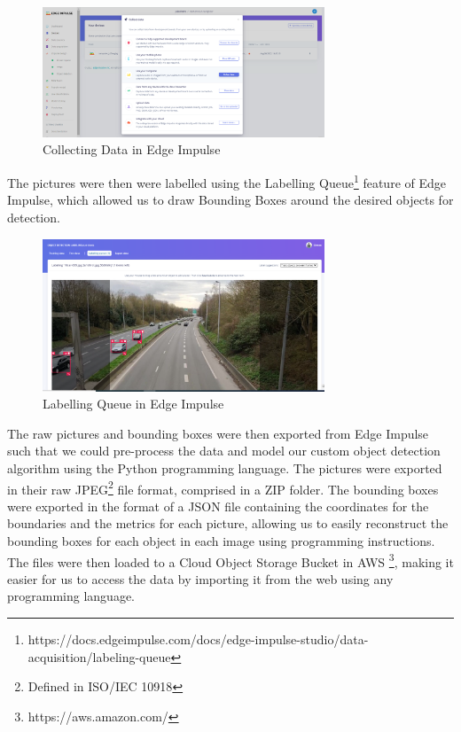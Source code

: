 \documentclass[openright]{normas-utf-tex} %
\begin{document}
\begin{figure}[H]
	\centering
	\includegraphics[width=0.75\textwidth]{./images/edge-impulse-collect-data.png}
	\caption[Collecting Data in Edge Impulse]{Collecting Data in Edge Impulse}
    \label{fig:diff}
\end{figure}

The pictures were then were labelled using the Labelling Queue\footnote{https://docs.edgeimpulse.com/docs/edge-impulse-studio/data-acquisition/labeling-queue}
feature of Edge Impulse, which allowed us to draw Bounding Boxes around the desired objects for detection.

\begin{figure}[H]
	\centering
	\includegraphics[width=0.75\textwidth]{./images/edge-impulse-labelling-queue.png}
	\caption[Labelling Queue in Edge Impulse]{Labelling Queue in Edge Impulse}
    \label{fig:diff}
\end{figure}

The raw pictures and bounding boxes were then exported from Edge Impulse such
that we could pre-process the data and model our custom object detection
algorithm using the Python programming language. The pictures were exported in
their raw JPEG\footnote{Defined in ISO/IEC 10918}  file format, comprised in a
ZIP folder. The bounding boxes were exported in the format of a JSON file
containing the coordinates for the boundaries and the metrics for each picture,
allowing us to easily reconstruct the bounding boxes for each object in each
image using programming instructions. The files were then loaded to a Cloud
Object Storage Bucket in AWS \footnote{https://aws.amazon.com/}, making it
easier for us to access the data by importing it from the web using any
programming language.
\end{document}

